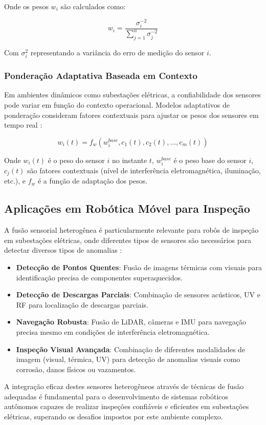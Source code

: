 Onde os pesos $w_i$ são calculados como:

\begin{equation}
w_i = \frac{\sigma_i^{-2}}{\sum_{j=1}^{n} \sigma_j^{-2}}
\end{equation}

Com $\sigma_i^2$ representando a variância do erro de medição do sensor $i$.

\subsubsection{Ponderação Adaptativa Baseada em Contexto}

Em ambientes dinâmicos como subestações elétricas, a confiabilidade dos sensores pode variar em função do contexto operacional. Modelos adaptativos de ponderação consideram fatores contextuais para ajustar os pesos dos sensores em tempo real \cite{Wang2024CombinedNav}:

\begin{equation}
w_i(t) = f_w(w_i^{base}, c_1(t), c_2(t), ..., c_m(t))
\end{equation}

Onde $w_i(t)$ é o peso do sensor $i$ no instante $t$, $w_i^{base}$ é o peso base do sensor $i$, $c_j(t)$ são fatores contextuais (nível de interferência eletromagnética, iluminação, etc.), e $f_w$ é a função de adaptação dos pesos.

\subsection{Aplicações em Robótica Móvel para Inspeção}

A fusão sensorial heterogênea é particularmente relevante para robôs de inspeção em subestações elétricas, onde diferentes tipos de sensores são necessários para detectar diversos tipos de anomalias \cite{Lactec2022, Iberdrola2022}:

\begin{itemize}
    \item \textbf{Detecção de Pontos Quentes}: Fusão de imagens térmicas com visuais para identificação precisa de componentes superaquecidos.
    
    \item \textbf{Detecção de Descargas Parciais}: Combinação de sensores acústicos, \ac{UV} e \ac{RF} para localização de descargas parciais.
    
    \item \textbf{Navegação Robusta}: Fusão de \ac{LiDAR}, câmeras e \ac{IMU} para navegação precisa mesmo em condições de interferência eletromagnética.
    
    \item \textbf{Inspeção Visual Avançada}: Combinação de diferentes modalidades de imagem (visual, térmica, \ac{UV}) para detecção de anomalias visuais como corrosão, danos físicos ou vazamentos.
\end{itemize}

A integração eficaz destes sensores heterogêneos através de técnicas de fusão adequadas é fundamental para o desenvolvimento de sistemas robóticos autônomos capazes de realizar inspeções confiáveis e eficientes em subestações elétricas, superando os desafios impostos por este ambiente complexo.
